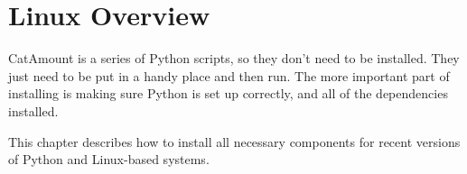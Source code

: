 \chapter{Linux Overview}
\hypertarget{linux-overview}{}

CatAmount is a series of Python scripts, so they don't need to be
installed. They just need to be put in a handy place and then run.
The more important part of installing is making sure Python is
set up correctly, and all of the dependencies installed.

This chapter describes how to install all necessary components
for recent versions of Python and Linux-based systems.
